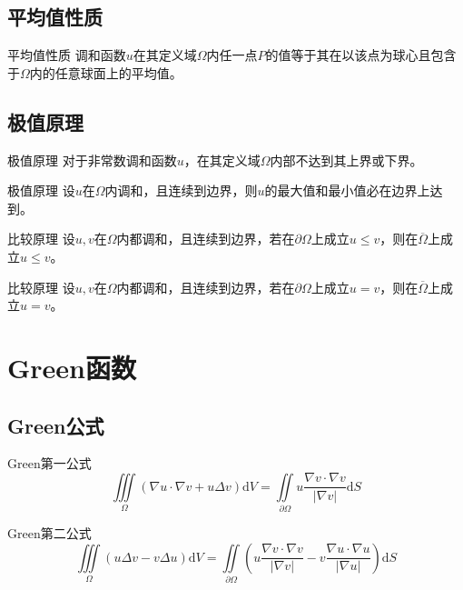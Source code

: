 \documentclass[lang = cn, scheme = chinese, thmcnt = section]{elegantbook}
\newcommand{\dd}{\mathrm{d}}           %
\newcommand{\IInt}{\iint\limits}
\newcommand{\IIInt}{\iiint\limits}
\begin{document}
\subsection{平均值性质}

\begin{theorem}{平均值性质}
	调和函数$u$在其定义域$\Omega$内任一点$P$的值等于其在以该点为球心且包含于$\Omega$内的任意球面上的平均值。
\end{theorem}

\subsection{极值原理}

\begin{theorem}{极值原理}
	对于非常数调和函数$u$，在其定义域$\Omega$内部不达到其上界或下界。
\end{theorem}

\begin{corollary}{极值原理}
	设$u$在$\Omega$内调和，且连续到边界，则$u$的最大值和最小值必在边界上达到。
\end{corollary}

\begin{corollary}{比较原理}
	设$u,v$在$\Omega$内都调和，且连续到边界，若在$\partial\Omega$上成立$u\le v$，则在$\overline{\Omega}$上成立$u\le v$。
\end{corollary}

\begin{corollary}{比较原理}
	设$u,v$在$\Omega$内都调和，且连续到边界，若在$\partial\Omega$上成立$u= v$，则在$\overline{\Omega}$上成立$u=v$。
\end{corollary}

\section{Green函数}

\subsection{Green公式}

\begin{theorem}{Green第一公式}
	$$
	\IIInt_\Omega(\nabla u\cdot\nabla v+u\Delta v)\dd V
	=\IInt_{\partial\Omega}u\frac{\nabla v\cdot\nabla v}{|\nabla v|}\dd S
	$$
\end{theorem}

\begin{theorem}{Green第二公式}
	$$
	\IIInt_\Omega(u\Delta v-v\Delta u)\dd V
	=\IInt_{\partial\Omega}\left(u\frac{\nabla v\cdot\nabla v}{|\nabla v|}-v\frac{\nabla u\cdot\nabla u}{|\nabla u|}\right)\dd S
	$$
\end{theorem}
\end{document}
